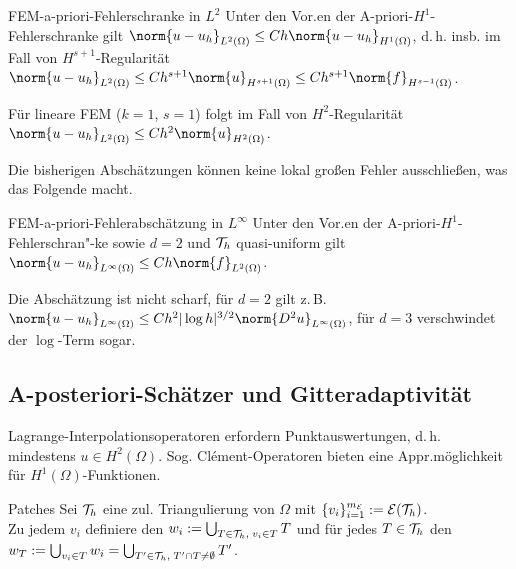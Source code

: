 \linie

\begin{Satz}{FEM-a-priori-Fehlerschranke in $L^2$}
    Unter den Vor.en der A-priori-$H^1$-Fehlerschranke gilt
    $\norm{u - u_h}_{L^2(\Omega)} \le Ch \norm{u - u_h}_{H^1(\Omega)}$,
    d.\,h. insb. im Fall von $H^{s+1}$-Regularität\\
    $\norm{u - u_h}_{L^2(\Omega)} \le Ch^{s+1} \norm{u}_{H^{s+1}(\Omega)}
    \le Ch^{s+1} \norm{f}_{H^{s-1}(\Omega)}$.
\end{Satz}

\begin{Bem}
    Für lineare FEM ($k = 1$, $s = 1$) folgt im Fall von $H^2$-Regularität\\
    $\norm{u - u_h}_{L^2(\Omega)} \le Ch^2 \norm{u}_{H^2(\Omega)}$.
\end{Bem}

\begin{Bem}
    Die bisherigen Abschätzungen können keine lokal großen Fehler ausschließen,
    was das Folgende macht.
\end{Bem}

\begin{Satz}{FEM-a-priori-Fehlerabschätzung in $L^\infty$}
    Unter den Vor.en der A-priori-$H^1$-Fehlerschran"-ke sowie
    $d = 2$ und $\mathcal{T}_h$ quasi-uniform gilt
    $\norm{u - u_h}_{L^\infty(\Omega)} \le Ch\norm{f}_{L^2(\Omega)}$.
\end{Satz}

\begin{Bem}
    Die Abschätzung ist nicht scharf, für $d = 2$ gilt z.\,B.\\
    $\norm{u - u_h}_{L^\infty(\Omega)} \le Ch^2 |\log h|^{3/2} \norm{D^2 u}_{L^\infty(\Omega)}$,
    für $d = 3$ verschwindet der $\log$-Term sogar.
\end{Bem}

\subsection{%
    A-posteriori-Schätzer und Gitteradaptivität%
}

\begin{Bem}
    Lagrange-Interpolationsoperatoren erfordern Punktauswertungen, d.\,h.
    mindestens $u \in H^2(\Omega)$.
    Sog. Clément-Operatoren bieten eine Appr.möglichkeit für $H^1(\Omega)$-Funktionen.
\end{Bem}

\begin{Def}{Patches}
    Sei $\mathcal{T}_h$ eine zul. Triangulierung von $\Omega$ mit
    $\{v_i\}_{i=1}^{m_{\mathcal{E}}} := \mathcal{E}(\mathcal{T}_h)$.\\
    Zu jedem $v_i$ definiere
    den 
    $w_i := \bigcup_{T \in \mathcal{T}_h,\; v_i \in T} T$ und für jedes $T \in \mathcal{T}_h$
    den 
    $w_T := \bigcup_{v_i \in T} w_i = \bigcup_{T' \in \mathcal{T}_h,\; T' \cap T \not= \emptyset} T'$.
\end{Def}

